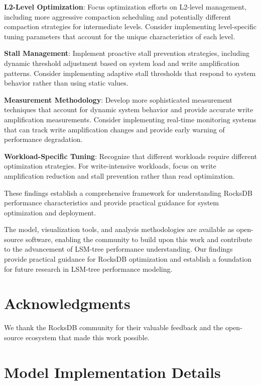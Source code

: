 \documentclass[11pt]{article}
\begin{document}
\textbf{L2-Level Optimization}: Focus optimization efforts on L2-level management, including more aggressive compaction scheduling and potentially different compaction strategies for intermediate levels. Consider implementing level-specific tuning parameters that account for the unique characteristics of each level.

\textbf{Stall Management}: Implement proactive stall prevention strategies, including dynamic threshold adjustment based on system load and write amplification patterns. Consider implementing adaptive stall thresholds that respond to system behavior rather than using static values.

\textbf{Measurement Methodology}: Develop more sophisticated measurement techniques that account for dynamic system behavior and provide accurate write amplification measurements. Consider implementing real-time monitoring systems that can track write amplification changes and provide early warning of performance degradation.

\textbf{Workload-Specific Tuning}: Recognize that different workloads require different optimization strategies. For write-intensive workloads, focus on write amplification reduction and stall prevention rather than read optimization.

These findings establish a comprehensive framework for understanding RocksDB performance characteristics and provide practical guidance for system optimization and deployment.

The model, visualization tools, and analysis methodologies are available as open-source software, enabling the community to build upon this work and contribute to the advancement of LSM-tree performance understanding. Our findings provide practical guidance for RocksDB optimization and establish a foundation for future research in LSM-tree performance modeling.

\section*{Acknowledgments}

We thank the RocksDB community for their valuable feedback and the open-source ecosystem that made this work possible.


\appendix

\section{Model Implementation Details}
\end{document}
